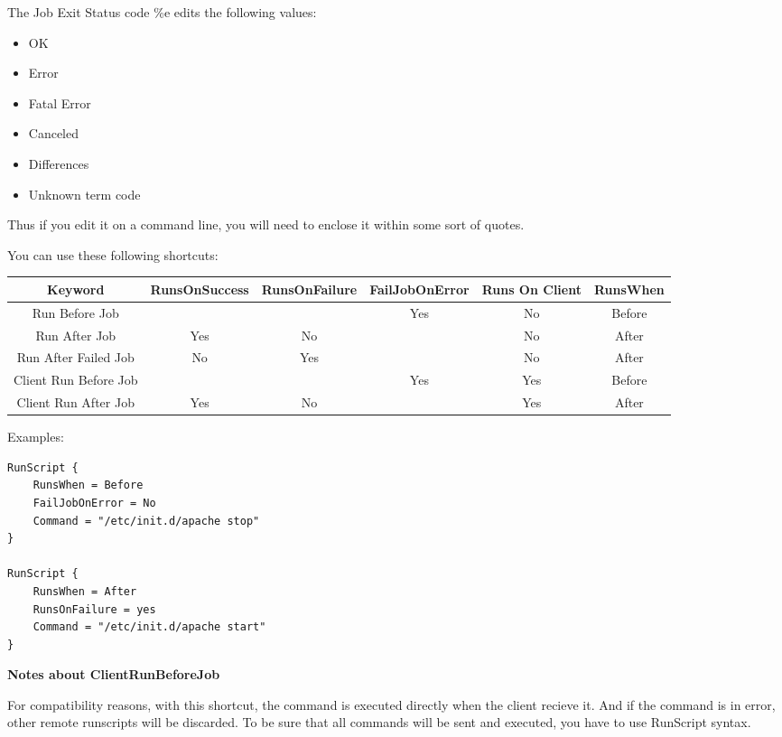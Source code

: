 \begin{description}
\begin{verbatim}
\end{verbatim}
\normalsize

The Job Exit Status code \%e edits the following values:

\begin{itemize}
\item OK
\item Error
\item Fatal Error
\item Canceled
\item Differences
\item Unknown term code
\end{itemize}

   Thus if you edit it on a command line, you will need to enclose 
   it within some sort of quotes.


You can use these following shortcuts:\\

\begin{tabular}{|c|c|c|c|c|c}
Keyword & RunsOnSuccess & RunsOnFailure  & FailJobOnError & Runs On Client & RunsWhen  \\
\hline
Run Before Job         &        &       & Yes     & No     & Before \\
\hline
Run After Job          &  Yes   &   No  &         & No     & After  \\
\hline
Run After Failed Job   &  No    &  Yes  &         & No     & After  \\
\hline
Client Run Before Job  &        &       & Yes     & Yes    & Before \\
\hline
Client Run After Job   &  Yes   &   No  &         & Yes    & After  \\
\end{tabular}

Examples:
\begin{verbatim}
RunScript {
    RunsWhen = Before
    FailJobOnError = No
    Command = "/etc/init.d/apache stop"
}

RunScript {
    RunsWhen = After
    RunsOnFailure = yes
    Command = "/etc/init.d/apache start"
}
\end{verbatim}

   {\bf Notes about ClientRunBeforeJob}

   For compatibility reasons, with this shortcut, the command is executed
   directly when the client recieve it. And if the command is in error, other
   remote runscripts will be discarded. To be sure that all commands will be
   sent and executed, you have to use RunScript syntax.


\end{description}
